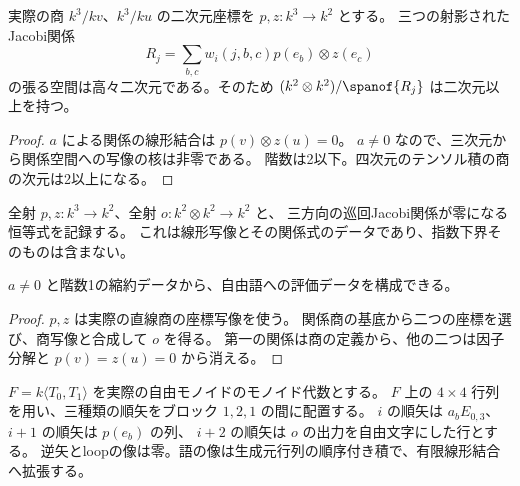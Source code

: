\begin{lemma}[直線商と関係商の次元]\label{lem:relation-quotient}
\leanok
{}
実際の商 $k^3/kv$、$k^3/ku$ の二次元座標を $p,z:k^3\to k^2$ とする。
三つの射影されたJacobi関係
\[
 R_j=\sum_{b,c}w_i(j,b,c)p(e_b)\otimes z(e_c)
\]
の張る空間は高々二次元である。そのため
$(k^2\otimes k^2)/\spanof{R_j}$ は二次元以上を持つ。
\end{lemma}
\begin{proof}\leanok
$a$ による関係の線形結合は $p(v)\otimes z(u)=0$。
$a\ne0$ なので、三次元から関係空間への写像の核は非零である。
階数は2以下。四次元のテンソル積の商の次元は2以上になる。
\end{proof}

\begin{definition}[自由語への評価に必要なデータ]\label{def:free-corner}
\leanok
{}
全射 $p,z:k^3\to k^2$、全射 $o:k^2\otimes k^2\to k^2$ と、
三方向の巡回Jacobi関係が零になる恒等式を記録する。
これは線形写像とその関係式のデータであり、指数下界そのものは含まない。
\end{definition}

\begin{lemma}[評価データの存在]\label{lem:free-corner-exists}
\leanok
{}
$a\ne0$ と階数1の縮約データから、自由語への評価データを構成できる。
\end{lemma}
\begin{proof}\leanok
$p,z$ は実際の直線商の座標写像を使う。
関係商の基底から二つの座標を選び、商写像と合成して $o$ を得る。
第一の関係は商の定義から、他の二つは因子分解と $p(v)=z(u)=0$ から消える。
\end{proof}

\begin{definition}[自由代数係数の行列評価]\label{def:matrix-evaluation}
\leanok
{}
$F=k\langle T_0,T_1\rangle$ を実際の自由モノイドのモノイド代数とする。
$F$ 上の $4\times4$ 行列を用い、三種類の順矢をブロック $1,2,1$ の間に配置する。
$i$ の順矢は $a_bE_{0,3}$、$i+1$ の順矢は $p(e_b)$ の列、
$i+2$ の順矢は $o$ の出力を自由文字にした行とする。
逆矢とloopの像は零。語の像は生成元行列の順序付き積で、有限線形結合へ拡張する。
\end{definition}

